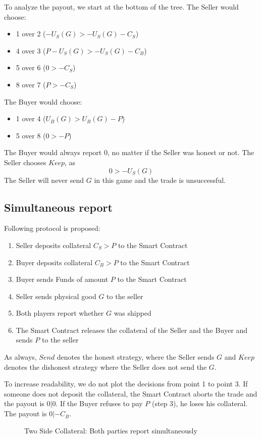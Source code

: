 \documentclass{cacthesis}
\begin{document}
To analyze the payout, we start at the bottom of the tree. The Seller would choose:
\begin{itemize}
    \item 1 over 2 ($-U_S(G) > -U_S(G) -C_S$)
    \item 4 over 3 ($P -U_S(G) > -U_S(G) -C_B$)
    \item 5 over 6 ($0 > -C_S$)
    \item 8 over 7 ($P >-C_S$)
\end{itemize}
The Buyer would choose:
\begin{itemize}
    \item 1 over 4 ($U_B(G) > U_B(G) - P$)
    \item 5 over 8 ($0 > -P$)
\end{itemize}
The Buyer would always report 0, no matter if the Seller was honest or not.\newline
The Seller chooses $Keep$, as 
\[0>-U_S(G)\]
The Seller will never send $G$ in this game and the trade is unsuccessful.

\subsection{Simultaneous report}
Following protocol is proposed:
\begin{enumerate}
    \item Seller deposits collateral $C_S > P$ to the Smart Contract
    \item Buyer deposits collateral $C_B > P$ to the Smart Contract
    \item Buyer sends Funds of amount $P$ to the Smart Contract
    \item Seller sends physical good $G$ to the seller
    \item Both players report whether $G$ was shipped
    \item The Smart Contract releases the collateral of the Seller and the Buyer and sends $P$ to the seller
\end{enumerate}
As always, $Send$ denotes the honest strategy, where the Seller sends $G$ and $Keep$ denotes the dishonest strategy where the Seller does not send the $G$.

To increase readability, we do not plot the decisions from point 1 to point 3. If someone does not deposit the collateral, the Smart Contract aborts the trade and the payout is $0|0$. If the Buyer refuses to pay $P$ (step 3), he loses his collateral. The payout is $0|-C_B$.\newline
\begin{figure}[htb!]
    \centering
    \caption{Two Side Collateral: Both parties report simultaneously}
\end{figure}
\end{document}
